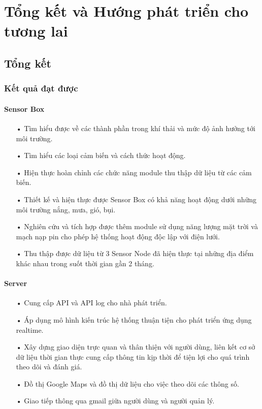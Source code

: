 \chapter{Tổng kết và Hướng phát triển cho tương lai}

\ifpdf
    \graphicspath{{Chapter5/Figs/Raster/}{Chapter5/Figs/PDF/}{Chapter5/Figs/}}
\else
    \graphicspath{{Chapter5/Figs/Vector/}{Chapter5/Figs/}}
\fi

\section{Tổng kết}
\subsection{Kết quả đạt được}

\subsubsection*{Sensor Box}
\begin{itemize}
\item[•] Tìm hiểu được về các thành phần trong khí thải và mức độ ảnh hưởng tới môi trường.
\item[•] Tìm hiểu các loại cảm biến và cách thức hoạt động. 
\item[•] Hiện thực hoàn chỉnh các chức năng module thu thập dữ liệu từ các cảm biến.
\item[•] Thiết kế và hiện thực được Sensor Box có khả năng hoạt động dưới những môi trường nắng, mưa, gió, bụi.
\item[•] Nghiên cứu và tích hợp được thêm module sử dụng năng lượng mặt trời và mạch nạp pin cho phép hệ thống hoạt động độc lập với điện lưới.
\item[•] Thu thập được dữ liệu từ 3 Sensor Node đã hiện thực tại những địa điểm khác nhau trong suốt thời gian gần 2 tháng.
\end{itemize}

\subsubsection*{Server}
\begin{itemize}
\item[•] Cung cấp API và API log cho nhà phát triển.
\item[•] Áp dụng mô hình kiến trúc hệ thống thuận tiện cho phát triển ứng dụng realtime.
\item[•] Xây dựng giao diện trực quan và thân thiện với người dùng, liên kết cơ sở dữ liệu thời gian thực cung cấp thông tin kịp thời để tiện lợi cho quá trình theo dõi và đánh giá.
\item[•] Đồ thị Google Maps và đồ thị dữ liệu cho việc theo dõi các thông số.
\item[•] Giao tiếp thông qua gmail giữa người dùng và người quản lý.
\end{itemize}

